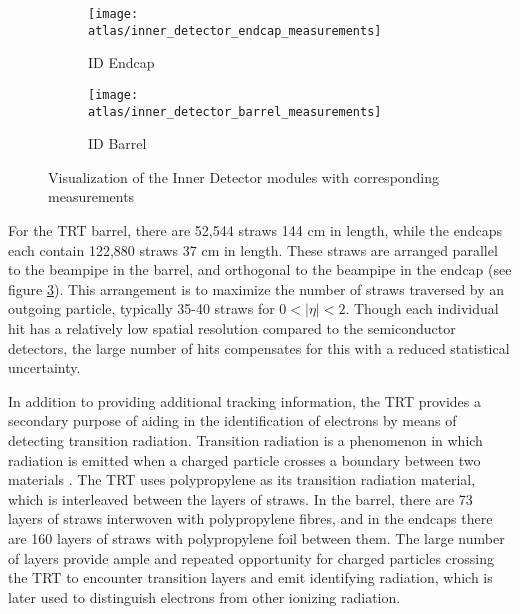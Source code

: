             \begin{figure}
                \begin{subfigure}{.48\textwidth}
                    \texttt{[image: atlas/inner\_detector\_endcap\_measurements]}
                    \caption{ID Endcap}
                    \label{fig:inner_detector_endcap_measurements}
                \end{subfigure}
                \begin{subfigure}{.48\textwidth}
                    \texttt{[image: atlas/inner\_detector\_barrel\_measurements]}
                    \caption{ID Barrel}
                    \label{fig:inner_detector_barrel_measurements}
                \end{subfigure}
                \caption{Visualization of the Inner Detector modules with corresponding measurements \cite{atlas_tdr}}
                \label{fig:inner_detector_measurements}
            \end{figure}

            For the TRT barrel, there are 52,544 straws 144 cm in length, while the endcaps each contain 122,880 straws 37 cm in length.
            These straws are arranged parallel to the beampipe in the barrel, and orthogonal to the beampipe in the endcap (see figure \ref{fig:inner_detector_measurements}).
            This arrangement is to maximize the number of straws traversed by an outgoing particle, typically 35-40 straws for $0 < |\eta| < 2$.
            Though each individual hit has a relatively low spatial resolution compared to the semiconductor detectors, the large number of hits compensates for this with a reduced statistical uncertainty.

            In addition to providing additional tracking information, the TRT provides a secondary purpose of aiding in the identification of electrons by means of detecting transition radiation. 
            Transition radiation is a phenomenon in which radiation is emitted when a charged particle crosses a boundary between two materials \cite{transition_radiation}.
            The TRT uses polypropylene as its transition radiation material, which is interleaved between the layers of straws.
            In the barrel, there are 73 layers of straws interwoven with polypropylene fibres, and in the endcaps there are 160 layers of straws with polypropylene foil between them.
            The large number of layers provide ample and repeated opportunity for charged particles crossing the TRT to encounter transition layers and emit identifying radiation, which is later used to distinguish electrons from other ionizing radiation.


